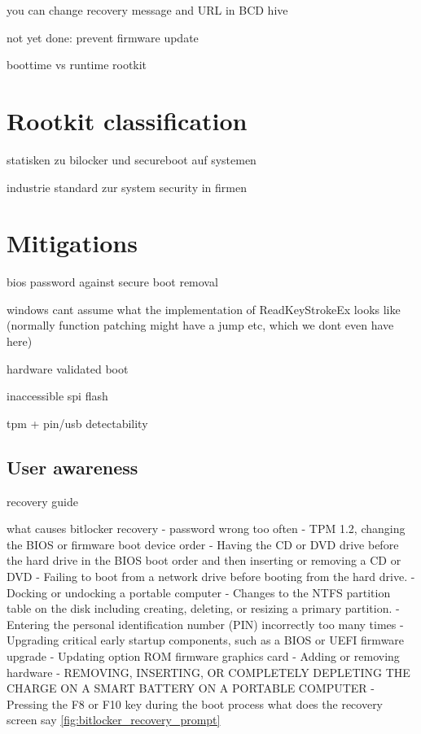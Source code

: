 you can change recovery message and URL in BCD hive

not yet done: prevent firmware update


boottime vs runtime rootkit

\section{Rootkit classification}

statisken zu bilocker und secureboot auf systemen

industrie standard zur system security in firmen

\section{Mitigations}

bios password against secure boot removal

windows cant assume what the implementation of ReadKeyStrokeEx looks like (normally function patching might have a jump etc, which we dont even have here)

hardware validated boot

inaccessible spi flash

tpm + pin/usb detectability

\subsection{User awareness}



recovery guide

what causes bitlocker recovery
- password wrong too often
- TPM 1.2, changing the BIOS or firmware boot device order
- Having the CD or DVD drive before the hard drive in the BIOS boot order and then inserting or removing a CD or DVD
- Failing to boot from a network drive before booting from the hard drive.
- Docking or undocking a portable computer
- Changes to the NTFS partition table on the disk including creating, deleting, or resizing a primary partition.
- Entering the personal identification number (PIN) incorrectly too many times
- Upgrading critical early startup components, such as a BIOS or UEFI firmware upgrade
- Updating option ROM firmware graphics card
- Adding or removing hardware
- REMOVING, INSERTING, OR COMPLETELY DEPLETING THE CHARGE ON A SMART BATTERY ON A PORTABLE COMPUTER
- Pressing the F8 or F10 key during the boot process
what does the recovery screen say \autoref{fig:bitlocker_recovery_prompt}

